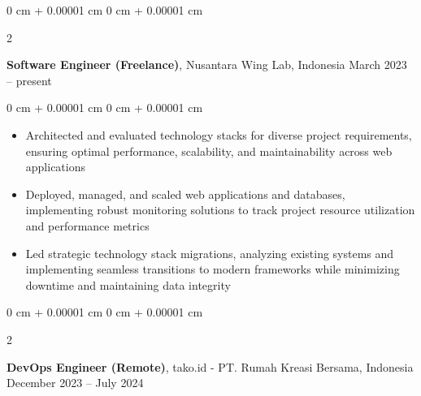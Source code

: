 \documentclass[10pt, a4paper]{article}
\newenvironment{highlights}{
    \begin{itemize}[
        topsep=0.10 cm,
        parsep=0.10 cm,
        partopsep=0pt,
        itemsep=0pt,
        leftmargin=0 cm + 10pt
    ]
}{
    \end{itemize}
} %
\newenvironment{onecolentry}{
    \begin{adjustwidth}{
        0 cm + 0.00001 cm
    }{
        0 cm + 0.00001 cm
    }
}{
    \end{adjustwidth}
} %
\newenvironment{twocolentry}[2][]{
    \onecolentry
    \def\secondColumn{#2}
    \setcolumnwidth{\fill, 4.5 cm}
    \begin{paracol}{2}
}{
    \switchcolumn \raggedleft \secondColumn
    \end{paracol}
    \endonecolentry
} %
\begin{document}
        \vspace{0.2 cm}

        
        \begin{twocolentry}{
            March 2023 – present
        }
            \textbf{Software Engineer (Freelance)}, Nusantara Wing Lab, Indonesia\end{twocolentry}

        \vspace{0.10 cm}
        \begin{onecolentry}
            \begin{highlights}
                \item Architected and evaluated technology stacks for diverse project requirements, ensuring optimal performance, scalability, and maintainability across web applications
                \item Deployed, managed, and scaled web applications and databases, implementing robust monitoring solutions to track project resource utilization and performance metrics
                \item Led strategic technology stack migrations, analyzing existing systems and implementing seamless transitions to modern frameworks while minimizing downtime and maintaining data integrity
            \end{highlights}
        \end{onecolentry}


        \vspace{0.2 cm}

        \begin{twocolentry}{
            December 2023 – July 2024
        }
            \textbf{DevOps Engineer (Remote)}, tako.id - PT. Rumah Kreasi Bersama, Indonesia\end{twocolentry}
\end{document}

